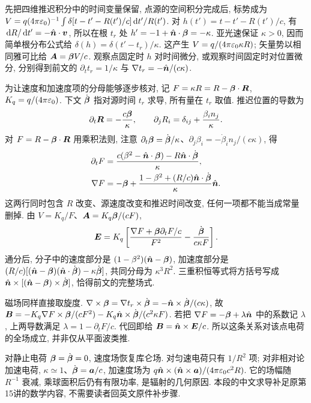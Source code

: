 先把四维推迟积分中的时间变量保留, 点源的空间积分完成后, 标势成为
$V=q(4\pi\varepsilon_0)^{-1}\int\delta[t-t'-R(t')/c]\,\mathrm d t'/R(t')$.
对 $h(t')=t-t'-R(t')/c$, 有 $\,\mathrm d R/\,\mathrm d t'=-\hat{\boldsymbol{n}}\cdot\boldsymbol{v}$, 所以在根 $t_r$ 处 $h'=-1+\hat{\boldsymbol{n}}\cdot\boldsymbol{\beta}=-\kappa$. 亚光速保证 $\kappa>0$, 因而简单根分布公式给 $\delta(h)=\delta(t'-t_r)/\kappa$. 这产生 $V=q/(4\pi\varepsilon_0\kappa R)$; 矢量势以相同雅可比给 $\boldsymbol{A}=\boldsymbol{\beta} V/c$. 观察点固定时 $h$ 对时间微分, 或观察时间固定时对位置微分, 分别得到前文的 $\partial_tt_r=1/\kappa$ 与 $\nabla t_r=-\hat{\boldsymbol{n}}/(c\kappa)$.

为让速度和加速度项的分母能够逐步核对, 记 $F=\kappa R=R-\boldsymbol{\beta}\cdot\boldsymbol{R}$, $K_q=q/(4\pi\varepsilon_0)$. 下文 $\dot{\boldsymbol{\beta}}$ 指对源时间 $t_r$ 求导, 所有量在 $t_r$ 取值. 推迟位置的导数为
\[
 \partial_t\boldsymbol{R}=-\frac{c\boldsymbol{\beta}}{\kappa},\qquad
 \partial_j R_i=\delta_{ij}+\frac{\beta_in_j}{\kappa}.
\]
对 $F=R-\boldsymbol{\beta}\cdot\boldsymbol{R}$ 用乘积法则, 注意 $\partial_t\boldsymbol{\beta}=\dot{\boldsymbol{\beta}}/\kappa$、$\partial_j\beta_i=-\dot\beta_in_j/(c\kappa)$, 得
\begin{align*}
 \partial_tF&=\frac{c(\beta^2-\hat{\boldsymbol{n}}\cdot\boldsymbol{\beta})-R\hat{\boldsymbol{n}}\cdot\dot{\boldsymbol{\beta}}}{\kappa},\\
 \nabla F&=-\boldsymbol{\beta}+\frac{1-\beta^2+(R/c)\hat{\boldsymbol{n}}\cdot\dot{\boldsymbol{\beta}}}{\kappa}\hat{\boldsymbol{n}}.
\end{align*}
这两行同时包含 $R$ 改变、源速度改变和推迟时间改变, 任何一项都不能当成常量删掉. 由 $V=K_q/F$、$\boldsymbol{A}=K_q\boldsymbol{\beta}/(cF)$,
\[
 \boldsymbol{E}=K_q\left[\frac{\nabla F+\boldsymbol{\beta}\partial_tF/c}{F^2}
 -\frac{\dot{\boldsymbol{\beta}}}{c\kappa F}\right].
\]
通分后, 分子中的速度部分是 $(1-\beta^2)(\hat{\boldsymbol{n}}-\boldsymbol{\beta})$, 加速度部分是
$(R/c)[(\hat{\boldsymbol{n}}-\boldsymbol{\beta})(\hat{\boldsymbol{n}}\cdot\dot{\boldsymbol{\beta}})-\kappa\dot{\boldsymbol{\beta}}]$,
共同分母为 $\kappa^3R^2$. 三重积恒等式将方括号写成 $\hat{\boldsymbol{n}}\times[(\hat{\boldsymbol{n}}-\boldsymbol{\beta})\times\dot{\boldsymbol{\beta}}]$, 恰得前文的完整场式.

磁场同样直接取旋度. $\nabla\times\boldsymbol{\beta}=\nabla t_r\times\dot{\boldsymbol{\beta}}=-\hat{\boldsymbol{n}}\times\dot{\boldsymbol{\beta}}/(c\kappa)$, 故
$\boldsymbol{B}=-K_q\nabla F\times\boldsymbol{\beta}/(cF^2)-K_q\hat{\boldsymbol{n}}\times\dot{\boldsymbol{\beta}}/(c^2\kappa F)$.
若把 $\nabla F=-\boldsymbol{\beta}+\lambda\hat{\boldsymbol{n}}$ 中的系数记 $\lambda$, 上两导数满足 $\lambda=1-\partial_tF/c$. 代回即给 $\boldsymbol{B}=\hat{\boldsymbol{n}}\times\boldsymbol{E}/c$. 所以这条关系对该点电荷的全场成立, 并非仅从平面波类推.

对静止电荷 $\boldsymbol{\beta}=\dot{\boldsymbol{\beta}}=0$, 速度场恢复库仑场. 对匀速电荷只有 $1/R^2$ 项; 对非相对论加速电荷, $\kappa\simeq1$、$\dot{\boldsymbol{\beta}}=\boldsymbol{a}/c$, 加速度场为 $q\hat{\boldsymbol{n}}\times(\hat{\boldsymbol{n}}\times\boldsymbol{a})/(4\pi\varepsilon_0 c^2R)$. 它的场幅随 $R^{-1}$ 衰减, 乘球面积后仍有有限功率, 是辐射的几何原因. 本段的中文求导补足原第15讲的数学内容, 不需要读者回英文原件补步骤.
